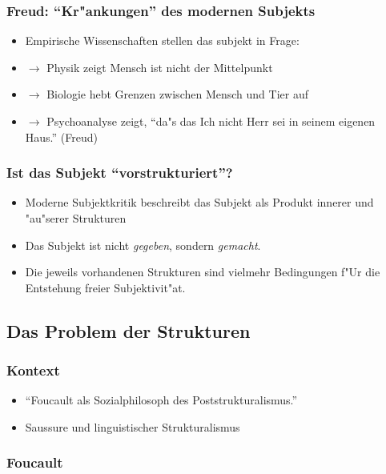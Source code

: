 \documentclass[emulatestandardclasses]{scrartcl}
\begin{document}
\subsubsection{Freud: "`Kr"ankungen"' des modernen Subjekts}

\begin{itemize}
  \item Empirische Wissenschaften stellen das subjekt in Frage: 
  \item $\rightarrow$ Physik zeigt Mensch ist nicht der Mittelpunkt
  \item $\rightarrow$ Biologie hebt Grenzen zwischen Mensch und Tier auf
  \item $\rightarrow$  Psychoanalyse zeigt, "`da"s das Ich nicht Herr sei in seinem eigenen Haus."' (Freud)
\end{itemize}

\subsubsection{Ist das Subjekt "`vorstrukturiert"'?}

\begin{itemize}
  \item Moderne Subjektkritik beschreibt das Subjekt als Produkt innerer und "au"serer Strukturen
  \item Das Subjekt ist nicht \emph{gegeben}, sondern \emph{gemacht}.
  \item Die jeweils vorhandenen Strukturen sind vielmehr Bedingungen f"Ur die Entstehung freier Subjektivit"at.
\end{itemize}

\subsection{Das Problem der Strukturen}

\subsubsection{Kontext}

\begin{itemize}
  \item "`Foucault als Sozialphilosoph des Poststrukturalismus."'
  \item Saussure und linguistischer Strukturalismus
\end{itemize}

\subsubsection{Foucault}
\end{document}
